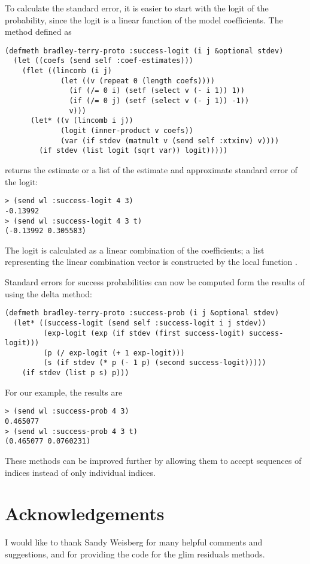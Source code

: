 To calculate the standard error, it is easier to start with the logit
of the probability, since the logit is a linear function of the model
coefficients. The method defined as
\begin{verbatim}
(defmeth bradley-terry-proto :success-logit (i j &optional stdev)
  (let ((coefs (send self :coef-estimates)))
    (flet ((lincomb (i j)
             (let ((v (repeat 0 (length coefs))))
               (if (/= 0 i) (setf (select v (- i 1)) 1))
               (if (/= 0 j) (setf (select v (- j 1)) -1))
               v)))
      (let* ((v (lincomb i j))
             (logit (inner-product v coefs))
             (var (if stdev (matmult v (send self :xtxinv) v))))
        (if stdev (list logit (sqrt var)) logit)))))
\end{verbatim}
returns the estimate or a list of the estimate and approximate
standard error of the logit:
\begin{verbatim}
> (send wl :success-logit 4 3)
-0.13992
> (send wl :success-logit 4 3 t)
(-0.13992 0.305583)
\end{verbatim}
The logit is calculated as a linear combination of the coefficients; a
list representing the linear combination vector is constructed by the
local function .

Standard errors for success probabilities can now be computed form
the results of  using the delta method:
\begin{verbatim}
(defmeth bradley-terry-proto :success-prob (i j &optional stdev)
  (let* ((success-logit (send self :success-logit i j stdev))
         (exp-logit (exp (if stdev (first success-logit) success-logit)))
         (p (/ exp-logit (+ 1 exp-logit)))
         (s (if stdev (* p (- 1 p) (second success-logit)))))
    (if stdev (list p s) p)))
\end{verbatim}
For our example, the results are
\begin{verbatim}
> (send wl :success-prob 4 3)
0.465077
> (send wl :success-prob 4 3 t)
(0.465077 0.0760231)
\end{verbatim}

These methods can be improved further by allowing them to accept
sequences of indices instead of only individual indices.

\section*{Acknowledgements}
I would like to thank Sandy Weisberg for many helpful comments and
suggestions, and for providing the code for the glim residuals
methods.

